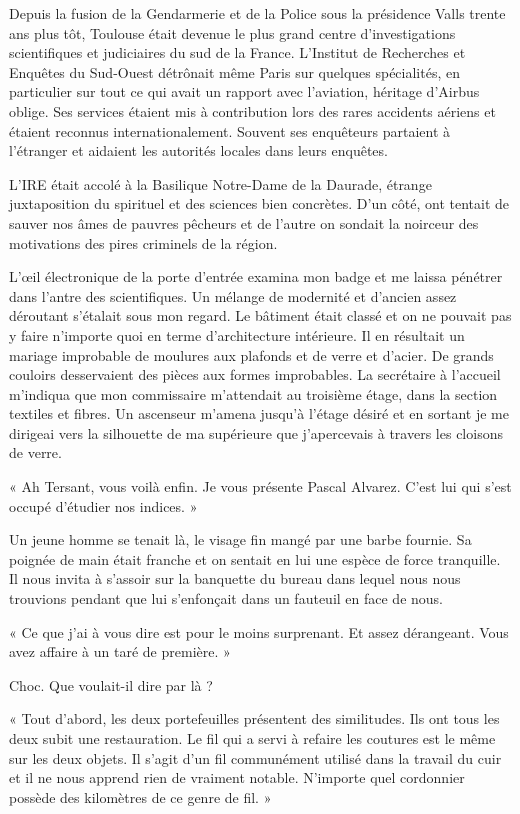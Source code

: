 Depuis la fusion de la Gendarmerie et de la Police sous la présidence Valls trente ans plus tôt, Toulouse était devenue 
le plus grand centre d'investigations scientifiques et judiciaires du sud de la France. L'Institut de Recherches et 
Enquêtes du Sud-Ouest détrônait même Paris sur quelques spécialités, en particulier sur tout ce qui avait un rapport 
avec l'aviation, héritage d'Airbus oblige. Ses services étaient mis à contribution lors des rares accidents aériens et 
étaient reconnus internationalement. Souvent ses enquêteurs partaient à l'étranger et aidaient les autorités locales 
dans leurs enquêtes.

L'IRE était accolé à la Basilique Notre-Dame de la Daurade, étrange juxtaposition du spirituel et des sciences bien 
concrètes. D'un côté, ont tentait de sauver nos âmes de pauvres pêcheurs et de l'autre on sondait la noirceur des 
motivations des pires criminels de la région.

L'œil électronique de la porte d'entrée examina mon badge et me laissa pénétrer dans l'antre des scientifiques. Un mélange 
de modernité et d'ancien assez déroutant s'étalait sous mon regard. Le bâtiment était classé et on ne pouvait pas y 
faire n'importe quoi en terme d'architecture intérieure. Il en résultait un mariage improbable de moulures aux plafonds 
et de verre et d'acier. De grands couloirs desservaient des pièces aux formes improbables. La secrétaire à l'accueil 
m'indiqua que mon commissaire m'attendait au troisième étage, dans la section textiles et fibres. Un ascenseur m'amena 
jusqu'à l'étage désiré et en sortant je me dirigeai vers la silhouette de ma supérieure que j'apercevais à travers les 
cloisons de verre.

« Ah Tersant, vous voilà enfin. Je vous présente Pascal Alvarez. C'est lui qui s'est occupé d'étudier nos indices. »

Un jeune homme se tenait là, le visage fin mangé par une barbe fournie. Sa poignée de main était franche et on sentait 
en lui une espèce de force tranquille. Il nous invita à s'assoir sur la banquette du bureau dans lequel nous 
nous trouvions pendant que lui s'enfonçait dans un fauteuil en face de nous.

« Ce que j'ai à vous dire est pour le moins surprenant. Et assez dérangeant. Vous avez affaire à un taré de première. »

Choc. Que voulait-il dire par là ?

« Tout d'abord, les deux portefeuilles présentent des similitudes. Ils ont tous les deux subit une restauration. Le fil 
qui a servi à refaire les coutures est le même sur les deux objets. Il s'agit d'un fil communément utilisé dans la 
travail du cuir et il ne nous apprend rien de vraiment notable. N'importe quel cordonnier possède des kilomètres de ce 
genre de fil. »


